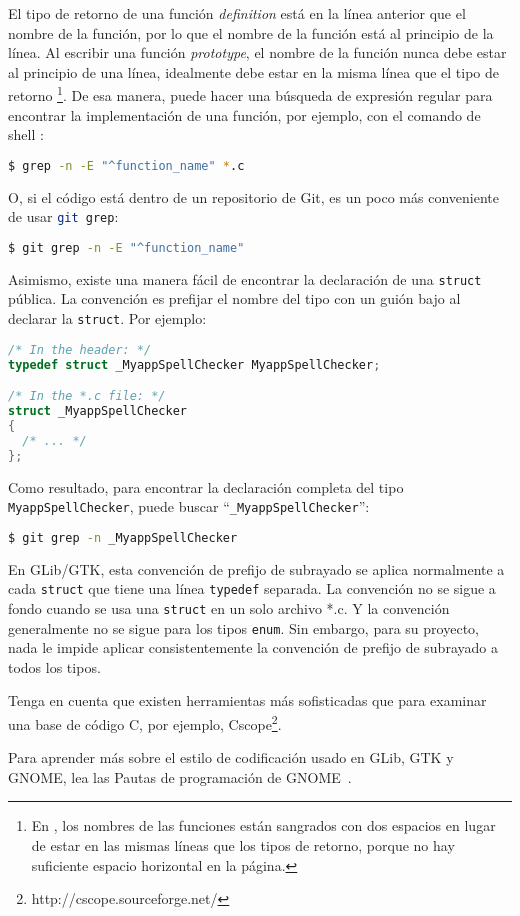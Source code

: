 El tipo de retorno de una función \emph{definition} está en la línea anterior que el nombre de la función, por lo que el nombre de la función está al principio de la línea. Al escribir una función \emph{prototype}, el nombre de la función nunca debe estar al principio de una línea, idealmente debe estar en la misma línea que el tipo de retorno \footnote{En , los nombres de las funciones están sangrados con dos espacios en lugar de estar en las mismas líneas que los tipos de retorno, porque no hay suficiente espacio horizontal en la página.}. De esa manera, puede hacer una búsqueda de expresión regular para encontrar la implementación de una función, por ejemplo, con el comando de shell :

\begin{lstlisting}[language=bash]
$ grep -n -E "^function_name" *.c
\end{lstlisting}

O, si el código está dentro de un repositorio de Git, es un poco más conveniente de usar \lstinline[language=bash]{git grep}:

\begin{lstlisting}[language=bash]
$ git grep -n -E "^function_name"
\end{lstlisting}

Asimismo, existe una manera fácil de encontrar la declaración de una \lstinline{struct} pública. La convención es prefijar el nombre del tipo con un guión bajo al declarar la \lstinline{struct}. Por ejemplo:

\begin{lstlisting}[language=C]
/* In the header: */
typedef struct _MyappSpellChecker MyappSpellChecker;

/* In the *.c file: */
struct _MyappSpellChecker
{
  /* ... */
};
\end{lstlisting}

Como resultado, para encontrar la declaración completa del tipo \lstinline{MyappSpellChecker}, puede buscar ``\lstinline{_MyappSpellChecker}'':

\begin{lstlisting}[language=bash]
$ git grep -n _MyappSpellChecker
\end{lstlisting}

En GLib/GTK, esta convención de prefijo de subrayado se aplica normalmente a cada \lstinline{struct} que tiene una línea \lstinline{typedef} separada. La convención no se sigue a fondo cuando se usa una \lstinline{struct} en un solo archivo *.c. Y la convención generalmente no se sigue para los tipos \lstinline{enum}. Sin embargo, para su proyecto, nada le impide aplicar consistentemente la convención de prefijo de subrayado a todos los tipos.

Tenga en cuenta que existen herramientas más sofisticadas que  para examinar una base de código C, por ejemplo, Cscope\footnote{http://cscope.sourceforge.net/}.

Para aprender más sobre el estilo de codificación usado en GLib, GTK y GNOME, lea las Pautas de programación de GNOME~\cite{gnome-programming-guidelines}.